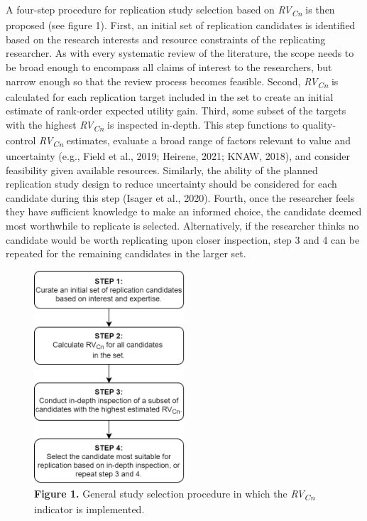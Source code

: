 \documentclass[
  man,floatsintext]{apa6}
\begin{document}
A four-step procedure for replication study selection based on \emph{RV\textsubscript{Cn}} is then proposed (see figure 1). First, an initial set of replication candidates is identified based on the research interests and resource constraints of the replicating researcher. As with every systematic review of the literature, the scope needs to be broad enough to encompass all claims of interest to the researchers, but narrow enough so that the review process becomes feasible. Second, \emph{RV\textsubscript{Cn}} is calculated for each replication target included in the set to create an initial estimate of rank-order expected utility gain. Third, some subset of the targets with the highest \emph{RV\textsubscript{Cn}} is inspected in-depth. This step functions to quality-control \emph{RV\textsubscript{Cn}} estimates, evaluate a broad range of factors relevant to value and uncertainty (e.g., Field et al., 2019; Heirene, 2021; KNAW, 2018), and consider feasibility given available resources. Similarly, the ability of the planned replication study design to reduce uncertainty should be considered for each candidate during this step (Isager et al., 2020). Fourth, once the researcher feels they have sufficient knowledge to make an informed choice, the candidate deemed most worthwhile to replicate is selected. Alternatively, if the researcher thinks no candidate would be worth replicating upon closer inspection, step 3 and 4 can be repeated for the remaining candidates in the larger set.

\begin{figure}
\centering
\includegraphics[width=0.5\textwidth,height=\textheight]{Figure_1.png}
\caption{\textbf{Figure 1.} General study selection procedure in which the \emph{RV\textsubscript{Cn}} indicator is implemented.}
\end{figure}
\end{document}
